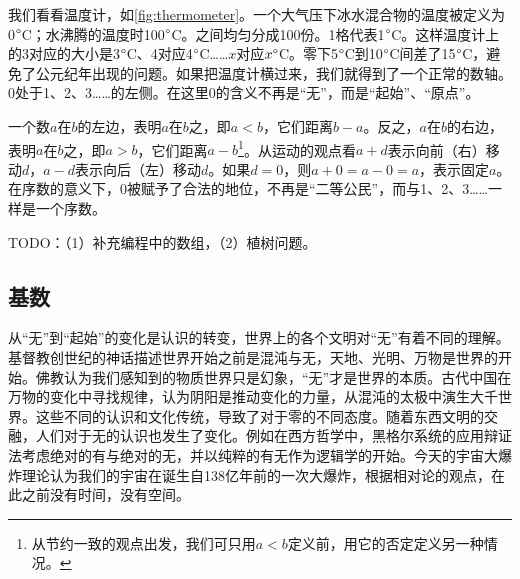 \documentclass[b5paper]{ctexart}
\begin{document}
我们看看温度计，如\cref{fig:thermometer}。一个大气压下冰水混合物的温度被定义为0$\degree$C；水沸腾的温度时100$\degree$C。之间均匀分成100份。1格代表1$\degree$C。这样温度计上的3对应的大小是3$\degree$C、4对应4$\degree$C……$x$对应$x \degree$C。零下5$\degree$C到10$\degree$C间差了15$\degree$C，避免了公元纪年出现的问题。如果把温度计横过来，我们就得到了一个正常的数轴。0处于1、2、3……的左侧。在这里0的含义不再是“无”，而是“起始”、“原点”。

\begin{center}
\end{center}

\label{sec:zero-as-ordinal}
一个数$a$在$b$的左边，表明$a$在$b$之，即$a < b$，它们距离$b - a$。反之，$a$在$b$的右边，表明$a$在$b$之，即$a > b$，它们距离$a - b$\footnote{从节约一致的观点出发，我们可只用$a<b$定义前，用它的否定定义另一种情况。}。从运动的观点看$a + d$表示向前（右）移动$d$，$a - d$表示向后（左）移动$d$。如果$d = 0$，则$a + 0 = a - 0 = a$，表示固定$a$。在序数的意义下，0被赋予了合法的地位，不再是“二等公民”，而与1、2、3……一样是一个序数。

TODO：（1）补充编程中的数组，（2）植树问题。

\subsection{基数}

从“无”到“起始”的变化是认识的转变，世界上的各个文明对“无”有着不同的理解。基督教创世纪的神话描述世界开始之前是混沌与无，天地、光明、万物是世界的开始。佛教认为我们感知到的物质世界只是幻象，“无”才是世界的本质。古代中国在万物的变化中寻找规律，认为阴阳是推动变化的力量，从混沌的太极中演生大千世界。这些不同的认识和文化传统，导致了对于零的不同态度。随着东西文明的交融，人们对于无的认识也发生了变化。例如在西方哲学中，黑格尔系统的应用辩证法考虑绝对的有与绝对的无，并以纯粹的有无作为逻辑学的开始。今天的宇宙大爆炸理论认为我们的宇宙在诞生自138亿年前的一次大爆炸，根据相对论的观点，在此之前没有时间，没有空间。
\end{document}
